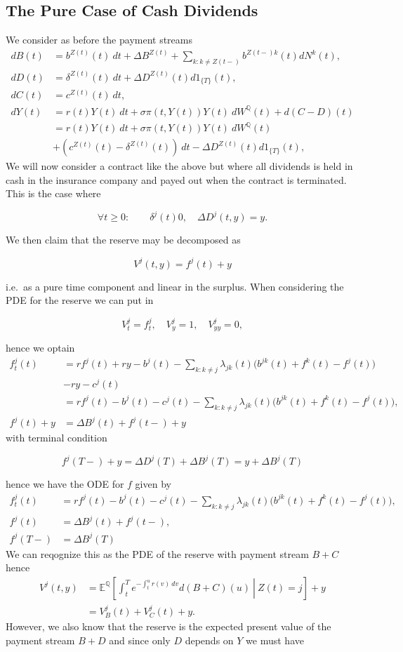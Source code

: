 \documentclass[
]{book}
\begin{document}
\hypertarget{the-pure-case-of-cash-dividends}{%
\subsection{The Pure Case of Cash Dividends}\label{the-pure-case-of-cash-dividends}}

We consider as before the payment streams
\begin{align*}
dB(t)&=b^{Z(t)}(t)\ dt + \Delta B^{Z(t)}+\sum_{k:k\ne Z(t-)}b^{Z(t-)k}(t)dN^k(t),\\
dD(t)&=\delta^{Z(t)}(t)\ dt+\Delta D^{Z(t)}(t)d1_{\{T\}}(t),\\
dC(t)&=c^{Z(t)}(t)\ dt,\\
dY(t)&=r(t)Y(t)\ dt + \sigma\pi(t,Y(t)) Y(t)\ dW^\mathbb Q(t) + d(C-D)(t)\\
&=r(t)Y(t)\ dt + \sigma\pi(t,Y(t)) Y(t)\ dW^\mathbb Q(t)\\
&+(c^{Z(t)}(t)-\delta^{Z(t)}(t))\ dt-\Delta D^{Z(t)}(t)d1_{\{T\}}(t),
\end{align*}
We will now consider a contract like the above but where all dividends is held in cash in the insurance company and payed out when the contract is terminated. This is the case where

\[
\forall t\ge 0:\qquad\delta^j(t)0,\quad\Delta D^j(t,y)=y.
\]

We then claim that the reserve may be decomposed as

\[
V^j(t,y)=f^j(t)+y
\]

i.e.~as a pure time component and linear in the surplus. When considering the PDE for the reserve we can put in

\[
V_t^j=f_t^j,\quad V_y^j=1,\quad V_{yy}^j=0,
\]

hence we optain
\begin{align*}
f_t^j(t)&=rf^j(t)+ry-b^j(t)-\sum_{k:k\ne j}\lambda_{jk}(t)\Big(b^{jk}(t)+f^k(t)-f^j(t)\Big)\\
&-ry-c^j(t)\\
&=rf^j(t)-b^j(t)-c^j(t)-\sum_{k:k\ne j}\lambda_{jk}(t)\Big(b^{jk}(t)+f^k(t)-f^j(t)\Big),\\
f^j(t)+y&=\Delta B^j(t)+f^j(t-)+y
\end{align*}
with terminal condition

\[
f^j(T-)+y=\Delta D^j(T)+\Delta B^j(T)=y+\Delta B^j(T)
\]

hence we have the ODE for \(f\) given by
\begin{align*}
f_t^j(t)&=rf^j(t)-b^j(t)-c^j(t)-\sum_{k:k\ne j}\lambda_{jk}(t)\Big(b^{jk}(t)+f^k(t)-f^j(t)\Big),\\
f^j(t)&=\Delta B^j(t)+f^j(t-),\\
f^j(T-)&=\Delta B^j(T)
\end{align*}
We can reqognize this as the PDE of the reserve with payment stream \(B+C\) hence
\begin{align*}
V^j(t,y)&=\mathbb E^{\mathbb Q}\left[\left.\int_t^Te^{-\int_t^u r(v)\ dv}d(B+C)(u)\ \right\vert\ Z(t)=j\right]+y\\
&=V_B^j(t)+V_C^j(t)+y.
\end{align*}
However, we also know that the reserve is the expected present value of the payment stream \(B+D\) and since only \(D\) depends on \(Y\) we must have
\end{document}
